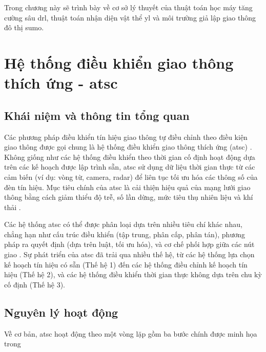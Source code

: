 Trong chương này sẽ trình bày về cơ sở lý thuyết của thuật toán học máy tăng
cường sâu \ac{drl}, thuật toán nhận diện vật thể \ac{yl} và môi trường giả lập giao
thông đô thị \ac{sumo}.

\section{Hệ thống điều khiển giao thông thích ứng - \ac{atsc}}
\subsection{Khái niệm và thông tin tổng quan}
Các phương pháp điều khiển tín hiệu giao thông tự điều chỉnh theo điều kiện giao
thông được gọi chung là hệ thống điều khiển giao thông thích ứng (\ac{atsc}) \cite{Shams2023}.
Không giống như các hệ thống điều khiển theo thời gian cố định hoạt động dựa
trên các kế hoạch được lập trình sẵn, \ac{atsc} sử dụng dữ liệu thời gian thực
từ các cảm biến (ví dụ: vòng từ, camera, radar) để liên tục tối ưu hóa các thông
số của đèn tín hiệu. Mục tiêu chính của \ac{atsc} là cải thiện hiệu quả của mạng
lưới giao thông bằng cách giảm thiểu độ trễ, số lần dừng, mức tiêu thụ nhiên liệu
và khí thải \cite{Stevanovic2010}.

Các hệ thống \ac{atsc} có thể được phân loại dựa trên nhiều tiêu chí khác nhau, chẳng
hạn như cấu trúc điều khiển (tập trung, phân cấp, phân tán), phương pháp ra
quyết định (dựa trên luật, tối ưu hóa), và cơ chế phối hợp giữa các nút giao
\cite{Shams2023}. Sự phát triển của \ac{atsc} đã trải qua nhiều thế hệ, từ các hệ
thống lựa chọn kế hoạch tín hiệu có sẵn (Thế hệ 1) đến các hệ thống điều chỉnh kế
hoạch tín hiệu (Thế hệ 2), và các hệ thống điều khiển thời gian thực không dựa
trên chu kỳ cố định (Thế hệ 3).
\newpage
\subsection{Nguyên lý hoạt động}
Về cơ bản, \ac{atsc} hoạt động theo một vòng lặp gồm ba bước chính được minh họa trong 


